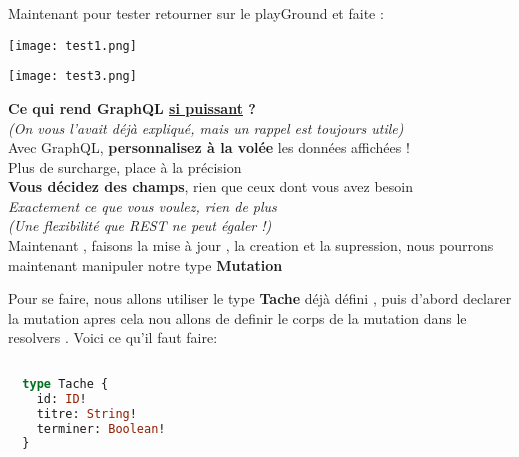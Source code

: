 \documentclass{article}
\begin{document}
Maintenant pour tester retourner sur le playGround et faite :


\begin{center}
\texttt{[image: test1.png]}
\end{center}
\begin{center}
\texttt{[image: test3.png]}
\end{center}
\vspace{1cm}
\noindent \textbf{Ce qui rend GraphQL \underline{si puissant} ?} \\  
\emph{(On vous l'avait déjà expliqué, mais un rappel est toujours utile)} \\[0.3em]  
Avec GraphQL, \textbf{personnalisez à la volée} les données affichées ! \\  
 Plus de surcharge, place à la précision \\  
\textbf{Vous décidez des champs}, rien que ceux dont vous avez besoin \\  
\emph{Exactement ce que vous voulez, rien de plus} \\[0.2em]  
{\footnotesize \textit{(Une flexibilité que REST ne peut égaler !)}}  \\

\vspace{1cm}
Maintenant , faisons la mise à jour , la creation et la supression, nous pourrons maintenant manipuler notre  type \textbf{Mutation}

Pour se faire, nous allons utiliser le type \textbf{Tache} déjà défini , puis d'abord declarer la mutation apres cela nou allons de definir le corps de la mutation dans le resolvers .
Voici ce qu'il faut faire:

  \begin{lstlisting}[language=GraphQL,basicstyle=\ttfamily\small]
    
  type Tache {
    id: ID!
    titre: String!
    terminer: Boolean!
  }
\end{lstlisting}
\end{document}
